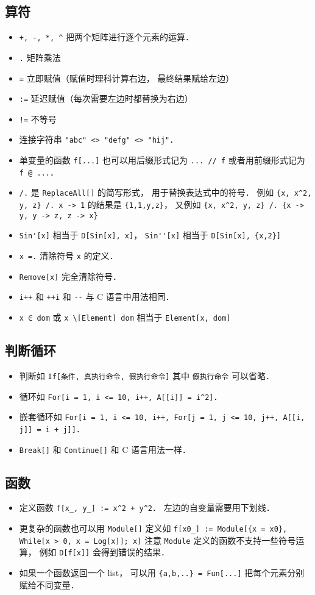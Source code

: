 \subsection{算符}
\begin{itemize}
\item \verb|+, -, *, ^| 把两个矩阵进行逐个元素的运算．
\item \verb|.| 矩阵乘法
\item \verb|=| 立即赋值（赋值时理科计算右边， 最终结果赋给左边）
\item \verb|:=| 延迟赋值（每次需要左边时都替换为右边）
\item \verb|!=| 不等号
\item 连接字符串 \verb|"abc" <> "defg" <> "hij"|．
\item 单变量的函数 \verb|f[...]| 也可以用后缀形式记为 \verb|... // f| 或者用前缀形式记为 \verb|f @ ...|．
\item \verb|/.| 是 \verb|ReplaceAll[]| 的简写形式， 用于替换表达式中的符号． 例如 \verb|{x, x^2, y, z} /. x -> 1| 的结果是 \verb|{1,1,y,z}|， 又例如 \verb|{x, x^2, y, z} /. {x -> y, y -> z, z -> x}|
\item \verb|Sin'[x]| 相当于 \verb|D[Sin[x], x]|， \verb|Sin''[x]| 相当于 \verb|D[Sin[x], {x,2}]|
\item \verb|x =.| 清除符号 \verb|x| 的定义．
\item \verb|Remove[x]| 完全清除符号．
\item \verb|i++| 和 \verb|++i| 和 \verb|--| 与 C 语言中用法相同．
\item \verb|x ∈ dom| 或 \verb|x \[Element] dom| 相当于 \verb|Element[x, dom]|
\end{itemize}

\subsection{判断循环}
\begin{itemize}
\item 判断如 \verb|If[条件, 真执行命令, 假执行命令]| 其中 \verb|假执行命令| 可以省略．
\item 循环如 \verb|For[i = 1, i <= 10, i++, A[[i]] = i^2]|．
\item 嵌套循环如 \verb|For[i = 1, i <= 10, i++, For[j = 1, j <= 10, j++, A[[i, j]] = i + j]]|．
\item \verb|Break[]| 和 \verb|Continue[]| 和 C 语言用法一样．
\end{itemize}

\subsection{函数}
\begin{itemize}
\item 定义函数 \verb|f[x_, y_] := x^2 + y^2|． 左边的自变量需要用下划线．
\item 更复杂的函数也可以用 \verb|Module[]| 定义如 \verb|f[x0_] := Module[{x = x0}, While[x > 0, x = Log[x]]; x]| 注意 \verb|Module| 定义的函数不支持一些符号运算， 例如 \verb|D[f[x]]| 会得到错误的结果．
\item 如果一个函数返回一个 list， 可以用 \verb|{a,b,..} = Fun[...]| 把每个元素分别赋给不同变量．
\end{itemize}

